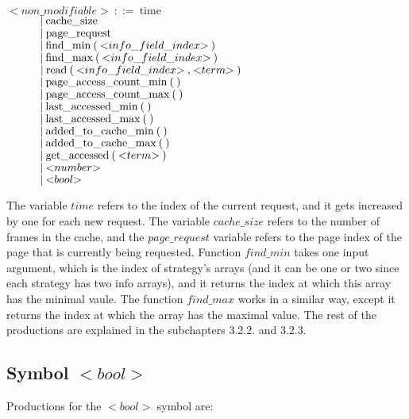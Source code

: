 \noindent
$ {<}non\_modifiable{>}\:::=\:\text{time} $\\
$ \indent\indent |\:\text{cache\_size} $\\
$ \indent\indent |\:\text{page\_request} $\\
$ \indent\indent |\:\text{find\_min}\:\text{(}\:{<}info\_field\_index{>}\:\text{)} $\\
$ \indent\indent |\:\text{find\_max}\:\text{(}\:{<}info\_field\_index{>}\:\text{)} $\\
$ \indent\indent |\:\text{read}\:\text{(}\:{<}info\_field\_index{>}\:\text{,}\:{<}term{>}\:\text{)} $\\
$ \indent\indent |\:\text{page\_access\_count\_min}\:\text{(}\:\text{)}$\\
$ \indent\indent |\:\text{page\_access\_count\_max}\:\text{(}\:\text{)}$\\
$ \indent\indent |\:\text{last\_accessed\_min}\:\text{(}\:\text{)}$\\
$ \indent\indent |\:\text{last\_accessed\_max}\:\text{(}\:\text{)}$\\
$ \indent\indent |\:\text{added\_to\_cache\_min}\:\text{(}\:\text{)}$\\
$ \indent\indent |\:\text{added\_to\_cache\_max}\:\text{(}\:\text{)}$\\
$ \indent\indent |\:\text{get\_accessed}\:\text{(}\:{<}term{>}\:\text{)}$\\
$ \indent\indent |\:{<}number{>} $\\
$ \indent\indent |\:{<}bool{>} $

The variable $time$ refers to the index of the current request, and it gets increased by one for each new request. The variable $cache\_size$ refers to the number of frames in the cache, and the $page\_request$ variable refers to the page index of the page that is currently being requested. Function $find\_min$ takes one input argument, which is the index of strategy's arrays (and it can be one or two since each strategy has two info arrays), and it returns the index at which this array has the minimal vaule. The function $find\_max$ works in a similar way, except it returns the index at which the array has the maximal value. The rest of the productions are explained in the subchapters 3.2.2. and 3.2.3.

\subsection{Symbol ${<}bool{>}$}
Productions for the ${<}bool{>}$ symbol are:

